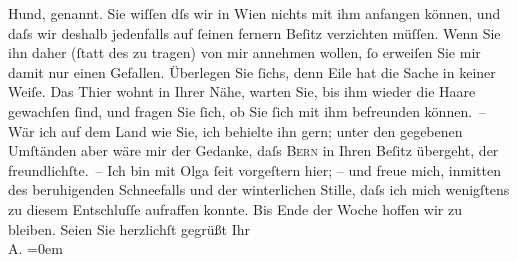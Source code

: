 \begin{ledgroupsized}[t]{13cm}
               Hund, \textsc{\label{K_L01265-1v}\label{K_L01265-1h}} genannt. Sie wiſſen dſs wir in Wien nichts
               mit ihm anfangen können, und daſs wir deshalb jedenfalls auf ſeinen fernern Beſitz
               verzichten {\pb}müſſen. Wenn Sie ihn daher (ſtatt des
                  \label{K_L01265_1v}\label{K_L01265_1h} zu tragen) von mir annehmen wollen, ſo erweiſen Sie
               mir damit nur einen Gefallen. Überlegen Sie ſichs, denn Eile hat die Sache in keiner
               Weiſe. Das Thier wohnt in Ihrer Nähe, warten Sie, bis ihm wieder {\pb}die Haare gewachſen ſind, und fragen Sie ſich, ob Sie
               ſich mit ihm befreunden können. – Wär ich auf dem Land wie Sie, ich behielte ihn
               gern; unter den gegebenen Umſtänden aber wäre mir der Gedanke, daſs \textsc{Bern} in Ihren Beſitz übergeht, der freundlichſte. –\pend
           \pstart
           {\pb}Ich bin mit Olga ſeit vorgeſtern hier; – und freue mich, inmitten des beruhigenden
               Schneefalls und der winterlichen Stille, daſs ich mich wenigſtens zu diesem
               Entschluſſe aufraffen konnte. Bis Ende der Woche hoffen wir zu bleiben.\pend
           \pstart
           Seien Sie herzlichſt gegrüßt\pend
           \pstart
           Ihr{\\[\baselineskip]}\spacefill\mbox{A.}\pend
           \leftskip=0em{}
         
         \endnumbering{}\end{ledgroupsized}  \newcommand{\dateiname}{L01265}\newcommand{\titel}{Arthur Schnitzler an Richard Beer-Hofmann, 14. 1. 1903}\newcommand{\editorInnen}{Martin Anton Müller und Gerd-Hermann Susen}
      